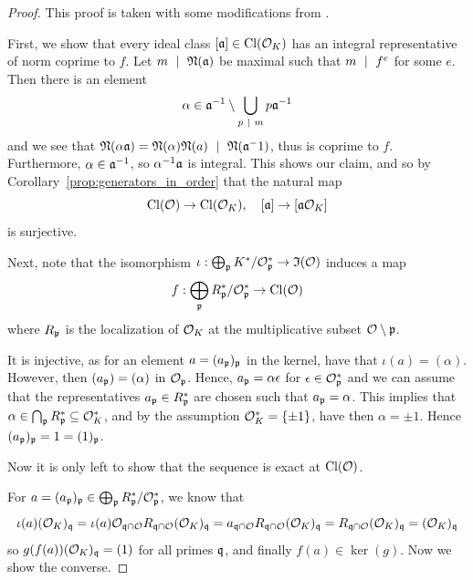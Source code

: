 \begin{proof}
    This proof is taken with some modifications from \cite[Prop.~I.12.11]{neukirch}.

    First, we show that every ideal class $[\mathfrak{a}] \in \mathrm{Cl}(\mathcal{O}_K)$ has an integral representative of norm coprime to $f$.
    Let $m \ \mid \  \mathfrak{N}(\mathfrak{a})$ be maximal such that $m \ \mid \  f^e$ for some $e$.
    Then there is an element
    \begin{equation*}
        \alpha \in \mathfrak{a}^{-1} \setminus \bigcup_{p \ \mid \  m} p\mathfrak{a}^{-1}
    \end{equation*}
    and we see that $\mathfrak{N}(\alpha\mathfrak{a}) = \mathfrak{N}(\alpha)\mathfrak{N}(a) \ \mid \  \mathfrak{N}(\mathfrak{a}^-1)$, thus is coprime to $f$.
    Furthermore, $\alpha \in \mathfrak{a}^{-1}$, so $\alpha^{-1}\mathfrak{a}$ is integral.
    This shows our claim, and so by Corollary~\ref{prop:generators_in_order} that the natural map
    \begin{equation*}
        \mathrm{Cl}(\mathcal{O}) \to \mathrm{Cl}(\mathcal{O}_K), \quad [\mathfrak{a}] \to [\mathfrak{a}\mathcal{O}_K]
    \end{equation*}
    is surjective.

    Next, note that the isomorphism $\iota: \bigoplus_{\mathfrak{p}} K^*/\mathcal{O}_{\mathfrak{p}}^* \to \mathfrak{I}(\mathcal{O})$ induces a map
    \begin{equation*}
        f: \bigoplus_{\mathfrak{p}} R_{\mathfrak{p}}^*/\mathcal{O}_{\mathfrak{p}}^* \to \mathrm{Cl}(\mathcal{O})
    \end{equation*}
    where $R_{\mathfrak{p}}$ is the localization of $\mathcal{O}_K$ at the multiplicative subset $\mathcal{O} \setminus \mathfrak{p}$.

    It is injective, as for an element $a = (a_{\mathfrak{p}})_{\mathfrak{p}}$ in the kernel, have that $\iota(a) = (\alpha)$.
    However, then $(a_{\mathfrak{p}}) = (\alpha)$ in $\mathcal{O}_{\mathfrak{p}}$.
    Hence, $a_{\mathfrak{p}} = \alpha\epsilon$ for $\epsilon \in \mathcal{O}_{\mathfrak{p}}^*$ and we can assume that the representatives $a_{\mathfrak{p}} \in R_{\mathfrak{p}}^*$ are chosen such that $a_{\mathfrak{p}} = \alpha$.
    This implies that $\alpha \in \bigcap_{\mathfrak{p}} R_{\mathfrak{p}}^* \subseteq \mathcal{O}_K^*$, and by the assumption $\mathcal{O}_K^* = \{ \pm 1 \}$, have then $\alpha = \pm 1$.
    Hence $(a_{\mathfrak{p}})_{\mathfrak{p}} = 1 = (1)_{\mathfrak{p}}$.

    Now it is only left to show that the sequence is exact at $\mathrm{Cl}(\mathcal{O})$.

    For $a = (a_{\mathfrak{p}})_{\mathfrak{p}} \in \bigoplus_{\mathfrak{p}} R_{\mathfrak{p}}^*/\mathcal{O}_{\mathfrak{p}}^*$, we know that
    \begin{equation*}
        \iota(a)(\mathcal{O}_K)_{\mathfrak{q}} = \iota(a) \mathcal{O}_{\mathfrak{q} \cap \mathcal{O}} R_{\mathfrak{q} \cap \mathcal{O}} (\mathcal{O}_K)_{\mathfrak{q}} = a_{\mathfrak{q} \cap \mathcal{O}} R_{\mathfrak{q} \cap \mathcal{O}} (\mathcal{O}_K)_{\mathfrak{q}} = R_{\mathfrak{q} \cap \mathcal{O}} (\mathcal{O}_K)_{\mathfrak{q}} = (\mathcal{O}_K)_{\mathfrak{q}}
    \end{equation*}
    so $g(f(a))(\mathcal{O}_K)_{\mathfrak{q}} = (1)$ for all primes $\mathfrak{q}$, and finally $f(a) \in \ker(g)$.
    Now we show the converse.


\end{proof}
